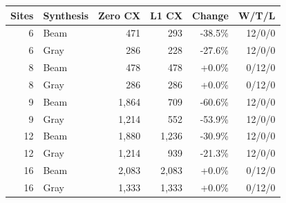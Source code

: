 \begin{tabular}{rlrrrr}
\toprule
Sites & Synthesis & Zero CX & L1 CX & Change & W/T/L\\
\midrule
6 & Beam & 471 & 293 & -38.5\% & 12/0/0\\
6 & Gray & 286 & 228 & -27.6\% & 12/0/0\\
8 & Beam & 478 & 478 & +0.0\% & 0/12/0\\
8 & Gray & 286 & 286 & +0.0\% & 0/12/0\\
9 & Beam & 1,864 & 709 & -60.6\% & 12/0/0\\
9 & Gray & 1,214 & 552 & -53.9\% & 12/0/0\\
12 & Beam & 1,880 & 1,236 & -30.9\% & 12/0/0\\
12 & Gray & 1,214 & 939 & -21.3\% & 12/0/0\\
16 & Beam & 2,083 & 2,083 & +0.0\% & 0/12/0\\
16 & Gray & 1,333 & 1,333 & +0.0\% & 0/12/0\\
\bottomrule
\end{tabular}

